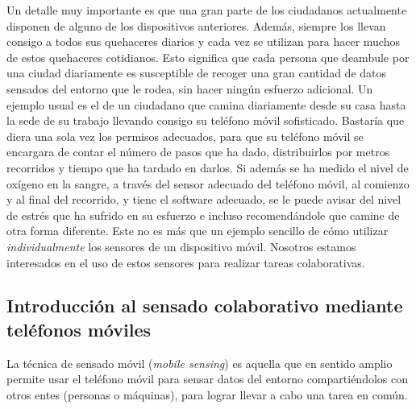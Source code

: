 Un detalle muy importante es que una gran parte de los ciudadanos actualmente disponen de alguno de los dispositivos anteriores. Además, siempre los llevan consigo a todos sus quehaceres diarios y cada vez se utilizan para hacer muchos de estos quehaceres cotidianos. Esto significa que cada persona que deambule por una ciudad diariamente es susceptible de recoger una gran cantidad de datos sensados del entorno que le rodea, sin hacer ningún esfuerzo adicional. Un ejemplo usual es el de un ciudadano que camina diariamente desde su casa hasta la sede de su trabajo llevando consigo su teléfono móvil sofisticado. Bastaría que diera una sola vez los permisos adecuados, para que su teléfono móvil se encargara de contar el número de pasos que ha dado, distribuirlos por metros recorridos y tiempo que ha tardado en darlos. Si además se ha medido el nivel de oxígeno en la sangre, a través del sensor adecuado del teléfono móvil, al comienzo y al final del recorrido, y tiene el software adecuado, se le puede avisar del nivel de estrés que ha sufrido en su esfuerzo e incluso recomendándole que camine de otra forma diferente. Este no es más que un ejemplo sencillo de cómo utilizar \emph{individualmente} los sensores de un dispositivo móvil. Nosotros estamos interesados en el uso de estos sensores para realizar tareas colaborativas.

\subsection{Introducción al sensado colaborativo mediante teléfonos móviles}

La técnica de sensado móvil (\emph{mobile sensing}) \cite{MobileSensing} es aquella que en sentido amplio permite usar el teléfono móvil para sensar datos del entorno compartiéndolos con otros entes (personas o máquinas), para lograr llevar a cabo una tarea en común.

